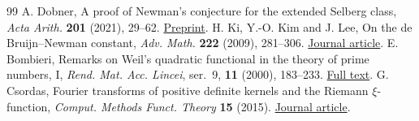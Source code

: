 \documentclass[11pt,a4paper]{article}
\numberwithin{equation}{section}
\begin{document}
\begin{thebibliography}{99}
 A. Dobner, A proof of Newman's conjecture for the extended Selberg class, \emph{Acta Arith.} \textbf{201} (2021), 29--62. \href{https://arxiv.org/abs/2005.05142}{Preprint}.
 H. Ki, Y.-O. Kim and J. Lee, On the de Bruijn--Newman constant, \emph{Adv. Math.} \textbf{222} (2009), 281--306. \href{https://doi.org/10.1016/j.aim.2009.04.003}{Journal article}.
 E. Bombieri, Remarks on Weil's quadratic functional in the theory of prime numbers, I, \emph{Rend. Mat. Acc. Lincei}, ser.~9, \textbf{11} (2000), 183--233. \href{https://www.bdim.eu/item?fmt=pdf&id=RLIN_2000_9_11_3_183_0}{Full text}.
 G. Csordas, Fourier transforms of positive definite kernels and the Riemann $\xi$-function, \emph{Comput. Methods Funct. Theory} \textbf{15} (2015). \href{https://doi.org/10.1007/s40315-014-0105-8}{Journal article}.
\end{thebibliography}
\end{document}
